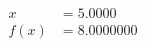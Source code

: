 \documentclass[preview]{standalone}
\begin{document}
\begin{align*}
x &= 5.0000\\f(x) &= 8.0000000
\end{align*}
\end{document}
